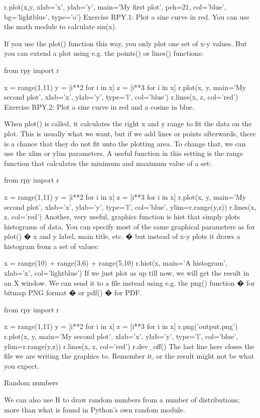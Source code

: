 r.plot(x,y, xlab='x', ylab='y', main='My first plot',
       pch=21, col='blue', bg='lightblue', type='o')
Exercise RPY.1: Plot a sine curve in red. You can use the math module to calculate sin(x).

If you use the plot() function this way, you only plot one set of x-y values. But you can extend a plot using e.g. the points() or lines() functions:

from rpy import r

x = range(1,11)
y = [i**2 for i in x]
z = [i**3 for i in x]
r.plot(x, y, main='My second plot', xlab='x', ylab='y', type='l', col='blue')
r.lines(x, z, col='red')
Exercise RPY.2: Plot a sine curve in red and a cosine in blue.

When plot() is called, it calculates the right x and y range to fit the data on the plot. This is usually what we want, but if we add lines or points afterwards, there is a chance that they do not fit unto the plotting area. To change that, we can use the xlim or ylim parameters. A useful function in this setting is the range function that calculates the minimum and maximum value of a set:

from rpy import r

x = range(1,11)
y = [i**2 for i in x]
z = [i**3 for i in x]
r.plot(x, y, main='My second plot', xlab='x', ylab='y', type='l', col='blue',
       ylim=r.range(y,z))
r.lines(x, z, col='red')
Another, very useful, graphics function is hist that simply plots histograms of data. You can specify most of the same graphical parameters as for plot() � x and y label, main title, etc. � but instead of x-y plots it draws a histogram from a set of values:

x = range(10) + range(3,6) + range(5,10)
r.hist(x, main='A histogram', xlab='x', col='lightblue')
If we just plot as up till now, we will get the result in an X window. We can send it to a file instead using e.g. the png() function � for bitmap PNG format � or pdf() � for PDF.

from rpy import r

x = range(1,11)
y = [i**2 for i in x]
z = [i**3 for i in x]
r.png('output.png')
r.plot(x, y, main='My second plot', xlab='x', ylab='y', type='l', col='blue',
       ylim=r.range(y,z))
r.lines(x, z, col='red')
r.dev_off()
The last line here closes the file we are writing the graphics to. Remember it, or the result might not be what you expect.

Random numbers

We can also use R to draw random numbers from a number of distributions; more than what is found in Python's own random module.

